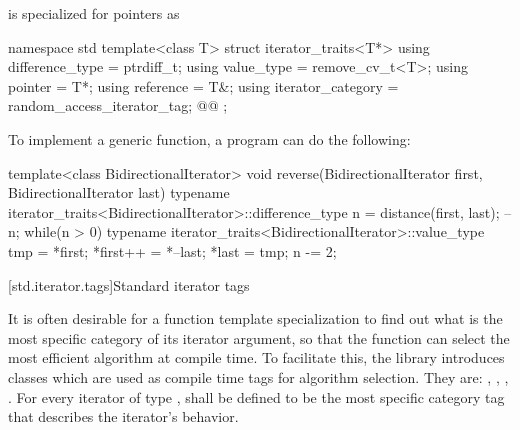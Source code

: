 \pnum
{} is specialized for pointers as

\begin{codeblock}
namespace std {
  template<class T> struct iterator_traits<T*> {
    using difference_type   = ptrdiff_t;
    using value_type        = remove_cv_t<T>;
    using pointer           = T*;
    using reference         = T&;
    using iterator_category = random_access_iterator_tag;
    @@
  };
}
\end{codeblock}

\pnum
\begin{example}
To implement a generic
function, a \Cpp{} program can do the following:

\begin{codeblock}
template<class BidirectionalIterator>
void reverse(BidirectionalIterator first, BidirectionalIterator last) {
  typename iterator_traits<BidirectionalIterator>::difference_type n =
    distance(first, last);
  --n;
  while(n > 0) {
    typename iterator_traits<BidirectionalIterator>::value_type
     tmp = *first;
    *first++ = *--last;
    *last = tmp;
    n -= 2;
  }
}
\end{codeblock}
\end{example}

[std.iterator.tags]{Standard iterator tags}


\pnum
{}%
%
%
%
%
%
It is often desirable for a
function template specialization
to find out what is the most specific category of its iterator
argument, so that the function can select the most efficient algorithm at compile time.
To facilitate this, the
library introduces
classes which are used as compile time tags for algorithm selection.
They are:
,
,
,
.
For every iterator of type
,
shall be defined to be the most specific category tag that describes the
iterator's behavior. 

